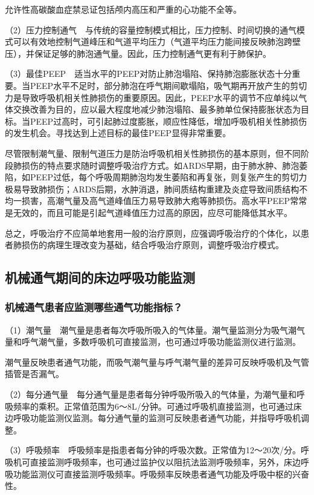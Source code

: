 允许性高碳酸血症禁忌证包括颅内高压和严重的心功能不全等。

（2）压力控制通气　与传统的容量控制模式相比，压力控制、时间切换的通气模式可以有效地控制气道峰压和气道平均压力（气道平均压力能间接反映肺泡跨壁压），并保证足够的肺泡通气量。因此，压力控制通气更有利于肺保护。

（3）最佳PEEP　适当水平的PEEP对防止肺泡塌陷、保持肺泡膨胀状态十分重要。当PEEP水平不足时，部分肺泡在呼气期间歇塌陷，吸气期再开放产生的剪切力是导致呼吸机相关性肺损伤的重要原因。因此，PEEP水平的调节不应单纯以气体交换改善为目的，应以最大程度地减少肺泡塌陷、最多肺单位保持膨胀状态为目标。当PEEP过高时，可引起肺过度膨胀，顺应性降低，增加呼吸机相关性肺损伤的发生机会。寻找达到上述目标的最佳PEEP显得非常重要。

尽管限制潮气量、限制气道压力是防治呼吸机相关性肺损伤的基本原则，但不同阶段肺损伤的特点要求随时调整呼吸治疗方式。如ARDS早期，由于肺水肿、肺泡萎陷，如PEEP过低，每个呼吸周期肺泡均发生萎陷和再复张，则复张产生的剪切力极易导致肺损伤；ARDS后期，水肿消退，肺间质结构重建及炎症导致间质结构不均一损害，高潮气量及高气道峰值压力易导致肺大疱等肺损伤。高水平PEEP常常是无效的，而且可能是引起气道峰值压力过高的原因，应尽可能降低其水平。

总之，呼吸治疗不应简单地套用一般的治疗原则，应强调呼吸治疗的个体化，以患者肺损伤的病理生理改变为基础，结合呼吸治疗原则，调整呼吸治疗模式。

\subsection{机械通气期间的床边呼吸功能监测}

\subsubsection{机械通气患者应监测哪些通气功能指标？}

（1）潮气量　潮气量是患者每次呼吸所吸入的气体量。潮气量监测分为吸气潮气量和呼气潮气量，多数呼吸机可直接监测，也可通过呼吸功能监测仪进行监测。

潮气量反映患者通气功能，而吸气潮气量与呼气潮气量的差异可反映呼吸机及气管插管是否漏气。

（2）每分通气量　每分通气量是患者每分钟呼吸所吸入的气体量，为潮气量和呼吸频率的乘积。正常值范围为6～8L/分钟。可通过呼吸机直接监测，也可通过床边呼吸功能监测仪监测。每分通气量的监测可反映患者通气功能，并指导呼吸机调整。

（3）呼吸频率　呼吸频率是指患者每分钟的呼吸次数。正常值为12～20次/分。呼吸机可直接监测呼吸频率，也可通过监护仪以阻抗法监测呼吸频率，另外，床边呼吸功能监测仪可直接监测呼吸频率。呼吸频率反映患者通气功能及呼吸中枢的兴奋性。

